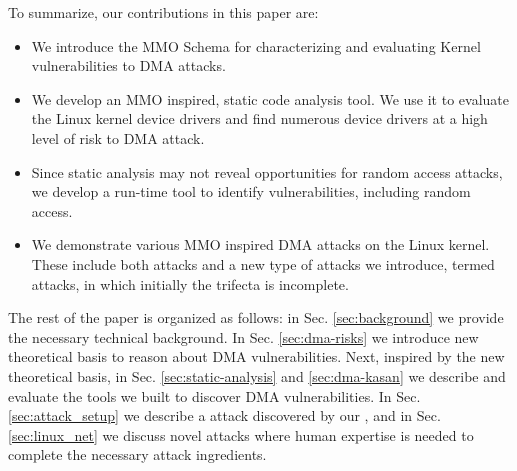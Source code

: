 %
To summarize, our contributions in this paper are:
\begin{itemize}
    \item We introduce the MMO Schema for characterizing and evaluating Kernel vulnerabilities to DMA attacks.
    \item We develop an MMO inspired, static code analysis tool. We use it to evaluate the Linux kernel device drivers and find numerous device drivers at a high level of risk to DMA attack.
    \item Since static analysis may not reveal opportunities for random access attacks, we develop a run-time tool to identify \subpage{} vulnerabilities, including random access.
    \item We demonstrate various MMO inspired DMA attacks on the Linux kernel. These include both \simple{} attacks and a new type of attacks we introduce, termed \compound{} attacks, in which initially the trifecta is incomplete. 
\end{itemize}





The rest of the paper is organized as follows:
in Sec. \ref{sec:background} we provide the necessary technical background. 
In Sec. \ref{sec:dma-risks} we introduce new theoretical basis to reason about DMA vulnerabilities.
Next, inspired by the new theoretical basis, in Sec. \ref{sec:static-analysis} and \ref{sec:dma-kasan} we describe and evaluate the tools we built to discover DMA vulnerabilities. 
In Sec. \ref{sec:attack_setup} we describe a \simple attack discovered by our \tool, and in Sec. \ref{sec:linux_net} we discuss novel \compound attacks where human expertise is needed to complete the necessary attack ingredients.


